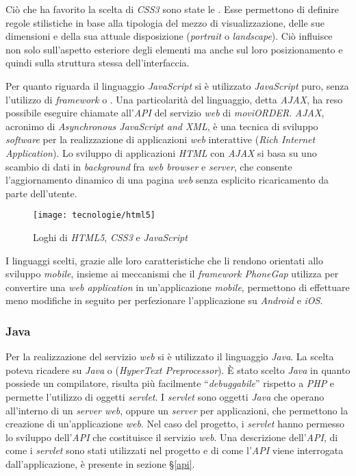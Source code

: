 Ciò che ha favorito la scelta di \textit{CSS3} sono state le . Esse permettono di definire regole stilistiche in base alla tipologia del mezzo di visualizzazione, delle sue dimensioni e della sua attuale disposizione (\textit{portrait} o \textit{landscape}). Ciò influisce non solo sull'aspetto esteriore degli elementi ma anche sul loro posizionamento e quindi sulla struttura stessa dell'interfaccia.

Per quanto riguarda il linguaggio \textit{JavaScript} si è utilizzato \textit{JavaScript} puro, senza l'utilizzo di \textit{framework} o . Una particolarità del linguaggio, detta \textit{AJAX}, ha reso possibile eseguire chiamate all'\textit{API} del servizio \textit{web} di \textit{moviORDER}. \textit{AJAX}, acronimo di \textit{\textit{Asynchronous JavaScript and XML}}, è una tecnica di sviluppo \textit{software} per la realizzazione di applicazioni \textit{web} interattive (\textit{Rich Internet Application}). Lo sviluppo di applicazioni \textit{HTML} con \textit{AJAX} si basa su uno scambio di dati in \textit{background} fra \textit{web browser} e \textit{server}, che consente l'aggiornamento dinamico di una pagina \textit{web} senza esplicito ricaricamento da parte dell'utente.

\begin{figure}[!h] 
    \centering 
    	\texttt{[image: tecnologie/html5]}
    \caption{Loghi di \textit{HTML5}, \textit{CSS3} e \textit{JavaScript}}
\end{figure}

I linguaggi scelti, grazie alle loro caratteristiche che li rendono orientati allo sviluppo \textit{mobile}, insieme ai meccanismi che il \textit{framework PhoneGap} utilizza per convertire una \textit{web application} in un'applicazione \textit{mobile}, permettono di effettuare meno modifiche in seguito per perfezionare l'applicazione su \textit{Android} e \textit{iOS}.

\subsubsection{Java}

Per la realizzazione del servizio \textit{web} si è utilizzato il linguaggio \textit{Java}. La scelta poteva ricadere su \textit{Java} o  (\textit{HyperText Preprocessor}). È stato scelto \textit{Java} in quanto possiede un compilatore, risulta più facilmente ``\textit{debuggabile}'' rispetto a \textit{PHP} e permette l'utilizzo di oggetti \textit{servlet}. I \textit{servlet} sono oggetti \textit{Java} che operano all'interno di un \textit{server web}, oppure un \textit{server} per applicazioni, che permettono la creazione di un'applicazione \textit{web}. Nel caso del progetto, i \textit{servlet} hanno permesso lo sviluppo dell'\textit{API} che costituisce il servizio \textit{web}. Una descrizione dell'\textit{API}, di come i \textit{servlet} sono stati utilizzati nel progetto e di come l'\textit{API} viene interrogata dall'applicazione, è presente in sezione §\ref{api}.

